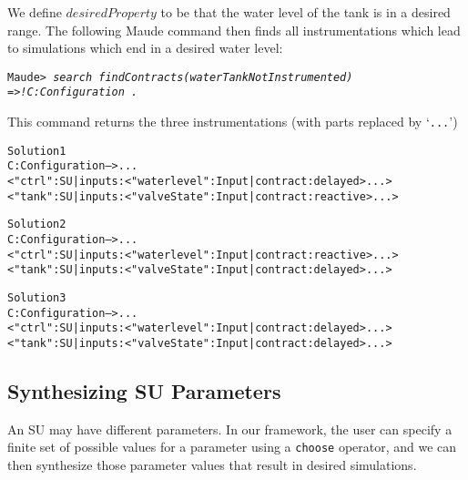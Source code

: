 \begin{example}
We define \(\mathit{desiredProperty}\) to be that the water level of the tank
is in a desired  range. 
%
The following Maude command then finds all instrumentations which
lead to simulations which end in a desired water level:

\small
\begin{alltt}
Maude>\,\emph{search\,findContracts(waterTankNotInstrumented)\,=>! C:Configuration\,.}
\end{alltt}
\normalsize

\noindent This command returns the three  instrumentations (with
parts replaced by `\texttt{...}')

\scriptsize
\begin{alltt}
Solution 1
C:Configuration --> ...
< "ctrl" : SU | inputs : < "waterlevel" : Input | contract : delayed > ... >
< "tank" : SU | inputs : < "valveState" : Input | contract : reactive > ... >

Solution 2
C:Configuration --> ...
< "ctrl" : SU | inputs : < "waterlevel" : Input | contract : reactive > ... >
< "tank" : SU | inputs : < "valveState" : Input | contract : delayed > ... >

Solution 3
C:Configuration --> ...
< "ctrl" : SU | inputs : < "waterlevel" : Input | contract : delayed > ... >
< "tank" : SU | inputs : < "valveState" : Input | contract : delayed > ... >
\end{alltt}
\normalsize

\end{example}

\subsection{Synthesizing SU Parameters}
An SU may have different parameters.
In our framework, the user can specify a finite set of possible values
for a parameter using a \texttt{choose} operator, and we can then
synthesize those parameter values that result in desired simulations. 
%

